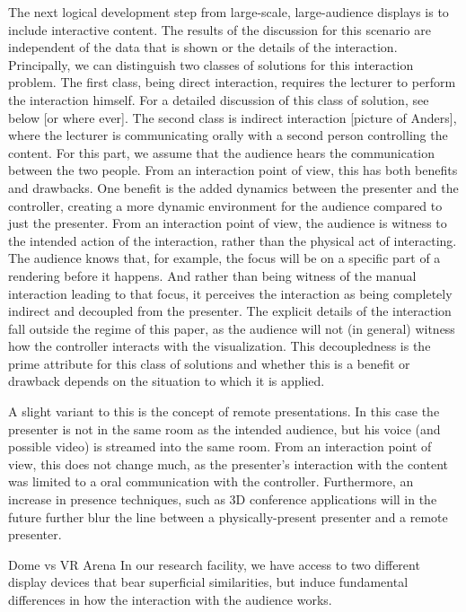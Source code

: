 \documentclass[review,journal]{vgtc}         %
\begin{document}
The next logical development step from large-scale, large-audience displays is to include interactive content.
The results of the discussion for this scenario are independent of the data that is shown or the details of the interaction.
Principally, we can distinguish two classes of solutions for this interaction problem.
The first class, being direct interaction, requires the lecturer to perform the interaction himself.
For a detailed discussion of this class of solution, see below [or where ever].
The second class is indirect interaction [picture of Anders], where the lecturer is communicating orally with a second person controlling the content.
For this part, we assume that the audience hears the communication between the two people.
From an interaction point of view, this has both benefits and drawbacks.
One benefit is the added dynamics between the presenter and the controller, creating a more dynamic environment for the audience compared to just the presenter.
From an interaction point of view, the audience is witness to the intended action of the interaction, rather than the physical act of interacting.
The audience knows that, for example, the focus will be on a specific part of a rendering before it happens.
And rather than being witness of the manual interaction leading to that focus, it perceives the interaction as being completely indirect and decoupled from the presenter.
The explicit details of the interaction fall outside the regime of this paper, as the audience will not (in general) witness how the controller interacts with the visualization.
This decoupledness is the prime attribute for this class of solutions and whether this is a benefit or drawback depends on the situation to which it is applied.

A slight variant to this is the concept of remote presentations.
In this case the presenter is not in the same room as the intended audience, but his voice (and possible video) is streamed into the same room.
From an interaction point of view, this does not change much, as the presenter's interaction with the content was limited to a oral communication with the controller.
Furthermore, an increase in presence techniques, such as 3D conference applications will in the future further blur the line between a physically-present presenter and a remote presenter.


Dome vs VR Arena
In our research facility, we have access to two different display devices that bear superficial similarities, but induce fundamental differences in how the interaction with the audience works.
\end{document}

